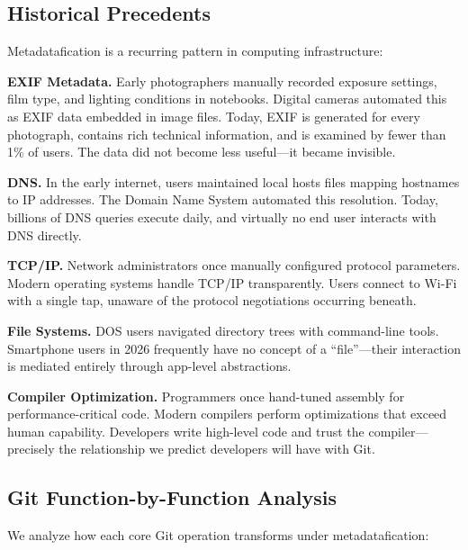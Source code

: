 \documentclass[12pt]{article}
\begin{document}
\subsection{Historical Precedents}

Metadatafication is a recurring pattern in computing infrastructure:

\textbf{EXIF Metadata.} Early photographers manually recorded exposure settings, film type, and lighting conditions in notebooks. Digital cameras automated this as EXIF data embedded in image files. Today, EXIF is generated for every photograph, contains rich technical information, and is examined by fewer than 1\% of users. The data did not become less useful---it became invisible.

\textbf{DNS.} In the early internet, users maintained local hosts files mapping hostnames to IP addresses. The Domain Name System automated this resolution. Today, billions of DNS queries execute daily, and virtually no end user interacts with DNS directly.

\textbf{TCP/IP.} Network administrators once manually configured protocol parameters. Modern operating systems handle TCP/IP transparently. Users connect to Wi-Fi with a single tap, unaware of the protocol negotiations occurring beneath.

\textbf{File Systems.} DOS users navigated directory trees with command-line tools. Smartphone users in 2026 frequently have no concept of a ``file''---their interaction is mediated entirely through app-level abstractions.

\textbf{Compiler Optimization.} Programmers once hand-tuned assembly for performance-critical code. Modern compilers perform optimizations that exceed human capability. Developers write high-level code and trust the compiler---precisely the relationship we predict developers will have with Git.

\subsection{Git Function-by-Function Analysis}

We analyze how each core Git operation transforms under metadatafication:
\end{document}
